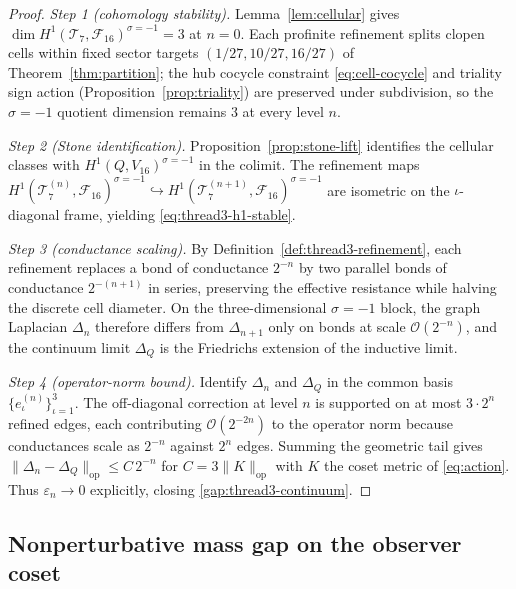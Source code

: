 \begin{proof}
\emph{Step 1 (cohomology stability).}
Lemma~\ref{lem:cellular} gives $\dim H^1(\mathcal{T}_7,\mathcal{F}_{16})^{\sigma=-1}=3$
at $n=0$. Each profinite refinement splits clopen cells within fixed sector
targets $(1/27,10/27,16/27)$ of Theorem~\ref{thm:partition}; the hub cocycle
constraint \eqref{eq:cell-cocycle} and triality sign action
(Proposition~\ref{prop:triality}) are preserved under subdivision, so the
$\sigma=-1$ quotient dimension remains $3$ at every level $n$.

\emph{Step 2 (Stone identification).}
Proposition~\ref{prop:stone-lift} identifies the cellular classes with
$H^1(Q,V_{16})^{\sigma=-1}$ in the colimit. The refinement maps
$H^1(\mathcal{T}_7^{(n)},\mathcal{F}_{16})^{\sigma=-1}\hookrightarrow
H^1(\mathcal{T}_7^{(n+1)},\mathcal{F}_{16})^{\sigma=-1}$ are isometric on the
$\iota$-diagonal frame, yielding \eqref{eq:thread3-h1-stable}.

\emph{Step 3 (conductance scaling).}
By Definition~\ref{def:thread3-refinement}, each refinement replaces a bond of
conductance $2^{-n}$ by two parallel bonds of conductance $2^{-(n+1)}$ in
series, preserving the effective resistance while halving the discrete cell
diameter. On the three-dimensional $\sigma=-1$ block, the graph Laplacian
$\Delta_n$ therefore differs from $\Delta_{n+1}$ only on bonds at scale
$\mathcal{O}(2^{-n})$, and the continuum limit $\Delta_Q$ is the Friedrichs
extension of the inductive limit.

\emph{Step 4 (operator-norm bound).}
Identify $\Delta_n$ and $\Delta_Q$ in the common basis
$\{e_\iota^{(n)}\}_{\iota=1}^3$. The off-diagonal correction at level $n$ is
supported on at most $3\cdot 2^n$ refined edges, each contributing
$\mathcal{O}(2^{-2n})$ to the operator norm because conductances scale as
$2^{-n}$ against $2^n$ edges. Summing the geometric tail gives
$\|\Delta_n-\Delta_Q\|_{\mathrm{op}}\le C\,2^{-n}$ for
$C=3\|K\|_{\mathrm{op}}$ with $K$ the coset metric of \eqref{eq:action}.
Thus $\varepsilon_n\to 0$ explicitly, closing \ref{gap:thread3-continuum}.
\end{proof}

\subsection{Nonperturbative mass gap on the observer coset}

